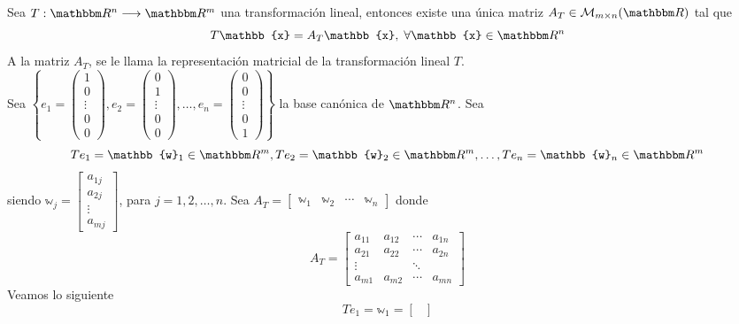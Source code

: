 \begin{theorem}
    Sea $T: \RR[n] \longrightarrow \RR[m]$ una transformación lineal, entonces existe una única matriz $A_T \in \matrizmn$ tal que
    $$T\mathbb{x} = A_T\mathbb{x}, \; \forall \mathbb{x} \in \RR[n]$$
    A la matriz $A_T$, se le llama la representación matricial de la transformación lineal $T$. \\
    \demostracion Sea $\displaystyle \left\{ e_1 = \left( \begin{array}{c} 1 \\ 0 \\ \vdots \\ 0 \\ 0 \end{array} \right),  e_2 = \left( \begin{array}{c} 0 \\ 1 \\ \vdots \\ 0 \\ 0 \end{array} \right),  \dots,  e_n = \left( \begin{array}{c} 0 \\ 0 \\ \vdots \\ 0 \\ 1 \end{array} \right) \right\}$ la base canónica de $\RR[n]$. Sea
    $$Te_1 = \mathbb{w}_1 \in \RR[m],  Te_2 = \mathbb{w}_2 \in \RR[m],  \dots,  Te_n = \mathbb{w}_n \in \RR[m]$$
    siendo $\mathbb{w}_j = \begin{bmatrix}
        a_{1j} \\
        a_{2j} \\
        \vdots \\
        a_{mj}
    \end{bmatrix}$, para $j = 1,  2,  \dots,  n$. Sea $A_T = \begin{bmatrix}
        \mathbb{w}_1 & \mathbb{w}_2 & \cdots & \mathbb{w}_n
    \end{bmatrix}$ donde
    $$A_T = \begin{bmatrix}
        a_{11} & a_{12} & \cdots & a_{1n} \\
        a_{21} & a_{22} & \cdots & a_{2n} \\
        \vdots & & \ddots & \\
        a_{m1} & a_{m2} & \cdots & a_{mn}
    \end{bmatrix}$$\newpage\noindent
    Veamos lo siguiente
    $$Te_1 = \mathbb{w}_1 = \begin{bmatrix}

\end{bmatrix}$$
\end{theorem}
